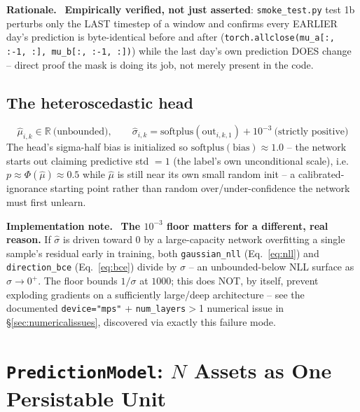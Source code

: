\documentclass[11pt]{article}
\newcommand{\code}[1]{\texttt{\small #1}}
\newcommand{\rationalelabel}{\small\textbf{Rationale.}~}
\newcommand{\fixnotelabel}{\small\textbf{Implementation note.}~}
\begin{document}
\begin{rationale}\rationalelabel
\textbf{Empirically verified, not just asserted}: \texttt{smoke\_test.py} test 1b perturbs
only the LAST timestep of a window and confirms every EARLIER day's prediction is
byte-identical before and after (\code{torch.allclose(mu\_a[:, :-1, :], mu\_b[:, :-1, :])})
while the last day's own prediction DOES change -- direct proof the mask is doing its job,
not merely present in the code.
\end{rationale}

\subsection{The heteroscedastic head}

\begin{equation}
  \hat\mu_{i,k} \in \mathbb{R} \ \text{(unbounded)}, \qquad
  \hat\sigma_{i,k} = \mathrm{softplus}(\text{out}_{i,k,1}) + 10^{-3} \ \text{(strictly positive)}
  \label{eq:heterosced}
\end{equation}
The head's sigma-half bias is initialized so $\mathrm{softplus}(\text{bias}) \approx 1.0$ --
the network starts out claiming predictive std $=1$ (the label's own unconditional scale),
i.e.\ $p \approx \Phi(\hat\mu) \approx 0.5$ while $\hat\mu$ is still near its own small random
init -- a calibrated-ignorance starting point rather than random over/under-confidence the
network must first unlearn.

\begin{fixnote}\fixnotelabel
\textbf{The $10^{-3}$ floor matters for a different, real reason.} If $\hat\sigma$ is driven
toward $0$ by a large-capacity network overfitting a single sample's residual early in
training, both \texttt{gaussian\_nll} (Eq.~\ref{eq:nll}) and \texttt{direction\_bce}
(Eq.~\ref{eq:bce}) divide by $\sigma$ -- an unbounded-below NLL surface as
$\sigma\!\to\!0^+$. The floor bounds $1/\sigma$ at $1000$; this does NOT, by itself, prevent
exploding gradients on a sufficiently large/deep architecture -- see the documented
\texttt{device="mps"} + \texttt{num\_layers}$>$1 numerical issue in
\S\ref{sec:numericalissues}, discovered via exactly this failure mode.
\end{fixnote}

\section{\texttt{PredictionModel}: $N$ Assets as One Persistable Unit}
\label{sec:predictionmodel}
\end{document}
